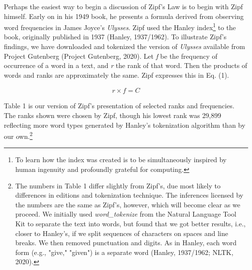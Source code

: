 \documentclass[12pt]{article}
\begin{document}
\indent 
Perhaps the easiest way to begin a discussion of Zipf's Law is to begin with Zipf himself.  Early on in his 1949 book, he presents a formula derived from observing word frequencies in James Joyce's \emph{Ulysses}. Zipf used the Hanley index\footnote[2]{To learn how the index was created is to be simultaneously inspired by human ingenuity and profoundly grateful for computing.} to the book, originally published in 1937  (Hanley, 1937/1962).  To illustrate Zipf's findings, we have downloaded and tokenized the version of \emph{Ulysses} available from Project Gutenberg (Project Gutenberg, 2020).  Let \emph{f} be the frequency of occurrence of a word in a text, and \emph{r} the rank of that word.  Then the products of words and ranks are approximately the same.  Zipf expresses this in Eq. (1).  

\begin{align}
r\times f = C
\end{align}

Table 1 is our version of Zipf's presentation of selected ranks and frequencies. The ranks shown were chosen by Zipf, though his lowest rank was 29,899 reflecting more word types generated by Hanley's tokenization algorithm than by our own.\footnote[3]{The numbers in Table 1 differ slightly from Zipf's, due most likely to differences in editions and tokenization technique.  The inferences licensed by the numbers are the same as Zipf's, however, which will become clear as we proceed.  We initially used \emph{word\_tokenize} from the Natural Language Tool Kit to separate the text into words, but found that we got better results, i.e., closer to Hanley's, if we split sequences of characters on spaces and line breaks.  We then removed punctuation and digits.   As in Hanley, each word form (e.g., "give," "given") is a separate word (Hanley, 1937/1962; NLTK, 2020).}  
\end{document}
